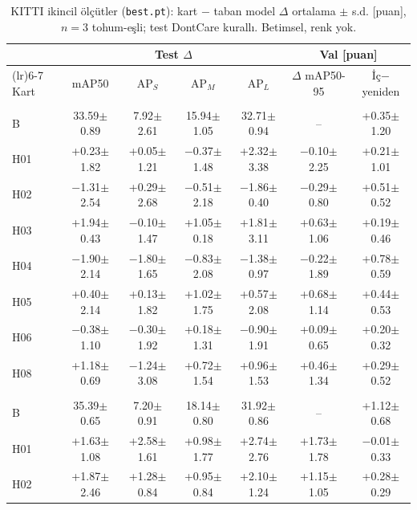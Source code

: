 \begin{table}[!htbp]
\centering\small\setlength{\tabcolsep}{3pt}
\caption{KITTI ikincil ölçütler (\texttt{best.pt}): kart $-$ taban model $\Delta$ ortalama $\pm$ s.d. [puan], $n=3$ tohum-eşli; test DontCare kurallı. Betimsel, renk yok.}\label{tab:kitti-test-ek}
\begin{tabularx}{\textwidth}{>{\raggedright\arraybackslash}X c c c c c c}
\toprule
\multicolumn{1}{@{}l}{} & \multicolumn{4}{c}{Test $\Delta$} & \multicolumn{2}{c}{Val [puan]} \\
\cmidrule(lr){2-5}\cmidrule(lr){6-7}
Kart & mAP50 & AP$_S$ & AP$_M$ & AP$_L$ & $\Delta$ mAP50-95 & İç$-$yeniden \\
\midrule
\multicolumn{7}{@{}l}{\textbf{YOLO26n}} \\
B & 33.59$\pm$0.89 & 7.92$\pm$2.61 & 15.94$\pm$1.05 & 32.71$\pm$0.94 & -- & +0.35$\pm$1.20 \\
H01 & +0.23$\pm$1.82 & +0.05$\pm$1.21 & $-$0.37$\pm$1.48 & +2.32$\pm$3.38 & $-$0.10$\pm$2.25 & +0.21$\pm$1.01 \\
H02 & $-$1.31$\pm$2.54 & +0.29$\pm$2.68 & $-$0.51$\pm$2.18 & $-$1.86$\pm$0.40 & $-$0.29$\pm$0.80 & +0.51$\pm$0.52 \\
H03 & +1.94$\pm$0.43 & $-$0.10$\pm$1.47 & +1.05$\pm$0.18 & +1.81$\pm$3.11 & +0.63$\pm$1.06 & +0.19$\pm$0.46 \\
H04 & $-$1.90$\pm$2.14 & $-$1.80$\pm$1.65 & $-$0.83$\pm$2.08 & $-$1.38$\pm$0.97 & $-$0.22$\pm$1.89 & +0.78$\pm$0.59 \\
H05 & +0.40$\pm$2.14 & +0.13$\pm$1.82 & +1.02$\pm$1.75 & +0.57$\pm$2.08 & +0.68$\pm$1.14 & +0.44$\pm$0.53 \\
H06 & $-$0.38$\pm$1.10 & $-$0.30$\pm$1.92 & +0.18$\pm$1.31 & $-$0.90$\pm$1.91 & +0.09$\pm$0.65 & +0.20$\pm$0.32 \\
H08 & +1.18$\pm$0.69 & $-$1.24$\pm$3.08 & +0.72$\pm$1.54 & +0.96$\pm$1.53 & +0.46$\pm$1.34 & +0.29$\pm$0.52 \\
\midrule
\multicolumn{7}{@{}l}{\textbf{YOLO11s}} \\
B & 35.39$\pm$0.65 & 7.20$\pm$0.91 & 18.14$\pm$0.80 & 31.92$\pm$0.86 & -- & +1.12$\pm$0.68 \\
H01 & +1.63$\pm$1.08 & +2.58$\pm$1.61 & +0.98$\pm$1.77 & +2.74$\pm$2.76 & +1.73$\pm$1.78 & $-$0.01$\pm$0.33 \\
H02 & +1.87$\pm$2.46 & +1.28$\pm$0.84 & +0.95$\pm$0.84 & +2.10$\pm$1.24 & +1.15$\pm$1.05 & +0.28$\pm$0.29 \\

\end{tabularx}
\end{table}
